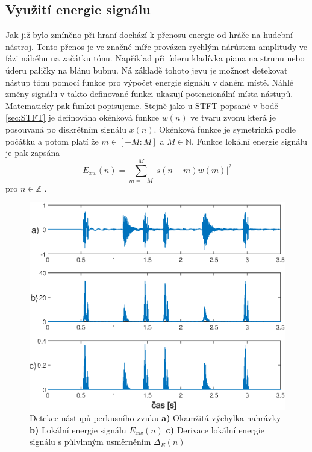  \subsection{Využití energie signálu} \label{sec:Energie_signalu}
  Jak již bylo zmíněno při hraní dochází k přenosu energie od hráče na hudební nástroj.
  Tento přenos je ve značné míře provázen rychlým nárůstem amplitudy ve fázi náběhu na začátku tónu.
  Například při úderu kladívka piana na strunu nebo úderu paličky na blánu bubnu.
  Ná základě tohoto jevu je možnost detekovat nástup tónu pomocí funkce pro výpočet energie signálu v daném místě.
  Náhlé změny signálu v takto definované funkci ukazují potencionální místa nástupů.
  Matematicky pak funkci popisujeme. 
  Stejně jako u \acs{STFT} popsané v bodě \ref{sec:STFT} je definována okénková funkce $w(n)$ ve tvaru zvonu  která je posouvaná po diskrétním signálu $x(n)$.
  Okénková funkce je symetrická podle počátku a potom platí že $ m \in [-M : M]$ a $M \in \mathbb{N}$. Funkce lokální energie signálu je pak zapsána
  \begin{equation}
    E_{xw}(n) = \sum_{m = -M}^{M} |s(n+m)w(m)|^2
  \end{equation}
  pro $n \in \mathbb{Z}$ \cite{fundamental_of_music_processing}.

  \begin{figure}[H]
    \centering
    \includegraphics[width = 0.8\linewidth]{obrazky/Energy_based_novely.eps}
    \caption{Detekce nástupů perkusního zvuku \textbf{a)} Okamžitá výchylka nahrávky \textbf{b)} Lokální energie signálu $E_{xw}(n)$ \textbf{c)} Derivace lokální energie signálu s půlvlnným usměrněním $\Delta_E(n)$}
    \label{fig:energy_based_novelty}
  \end{figure}

